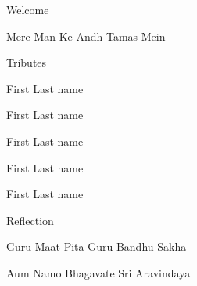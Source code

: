 \documentclass[12pt]{extarticle}
\begin{document}
\newpage
{}

\vspace*{\fill}

\begin{center}
\leafline


{
\vspace{1.5cm}
{\huge Welcome}

Mere Man Ke Andh Tamas Mein

\vspace{1.5cm}
{\huge Tributes}

First Last name

First Last name

First Last name

First Last name

First Last name


\vspace{1.5cm}
{\huge Reflection}

Guru Maat Pita Guru Bandhu Sakha

Aum Namo Bhagavate Sri Aravindaya

}
\end{center}



\end{document}
